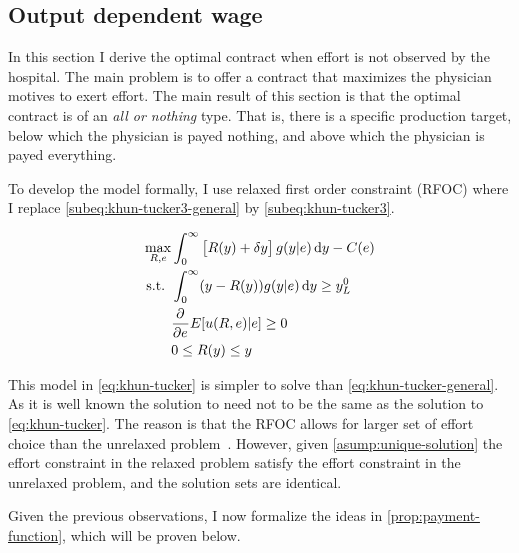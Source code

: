 
\subsection{Output dependent wage} %
\label{sub:output_dependent_wage}
In this section I derive the optimal contract when effort is not observed by the hospital. The main problem is to offer a contract that maximizes the physician motives to exert effort. The main result of this section is that the optimal contract is of an \emph{all or nothing} type. That is, there is a specific production target, below which the physician is payed nothing, and above which the physician is payed everything. 

To develop the model formally, I use \textcite{Rogerson1985FirstOrder} relaxed first order constraint (RFOC) where I replace \cref{subeq:khun-tucker3-general} by \cref{subeq:khun-tucker3}. 

\begin{subequations}
\label{eq:khun-tucker}
\begin{align}
    \max_{R,e} & \int_0^{\infty}\left[R(y)+\delta y\right]g(y|e)\dif y-C(e)\label{subeq:khun-tucker1} \\
    \text{s.t. }    & \int_{0}^{\infty} (y-R(y))g(y|e)\dif y\geq y_L^0 \label{subeq:khun-tucker2} \\
                    & \pder{e}E[u(R,e)|e]\geq 0 \label{subeq:khun-tucker3}\\
                    & 0\leq R(y)\leq y \label{subeq:khun-tucker4}
\end{align}
\end{subequations}

This model in \cref{eq:khun-tucker} is simpler to solve than \cref{eq:khun-tucker-general}. As it is well known the solution to need not to be the same as the solution to \cref{eq:khun-tucker}. The reason is that the RFOC allows for larger set of effort choice than the unrelaxed problem~\parencite[see][for a discussion]{Jewitt1988Justifying,Rogerson1985FirstOrder}. However, given \cref{asump:unique-solution} the effort constraint in the relaxed problem satisfy the effort constraint in the  unrelaxed problem, and the solution sets are identical. 

Given the previous observations, I now formalize the ideas in \cref{prop:payment-function}, which will be proven below. 

